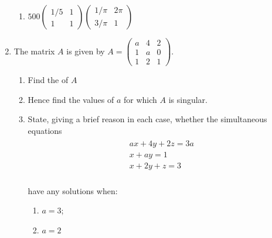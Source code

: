 \begin{enumerate}
\begin{enumerate}
\item 

\(500\begin{pmatrix} 1 / 5 & 1\\1 & 1\end{pmatrix}\begin{pmatrix} 1 / \pi & 2\pi\\3/\pi & 1\end{pmatrix}\)

\end{enumerate}

\item 

The matrix \(A\) is given by \(A=\begin{pmatrix}a & 4 & 2\\ 1 & a & 0\\ 1 & 2 & 1\end{pmatrix}\).
\begin{enumerate}

\item 

Find the  of \(A\)

\item 

Hence find the values of \(a\) for which \(A\) is singular.

\item 

State, giving a brief reason in each case, whether the simultaneous equations
\begin{equation*}
\begin{split}
          \begin{array}{l}
              a x + 4y + 2z= 3a\\
              x + a y = 1\\
              x + 2y + z = 3\\
          \end{array}
      \end{split}
\end{equation*}

have any solutions when:
\begin{enumerate}

\item 

\(a = 3\);

\item 

\(a = 2\)

\end{enumerate}


\end{enumerate}
\end{enumerate}

